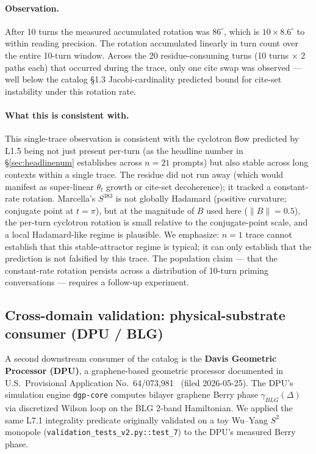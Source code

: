 \documentclass[11pt,letterpaper]{article}
\begin{document}
\paragraph{Observation.}
After 10 turns the measured accumulated rotation was $86^\circ$,
which is $10 \times 8.6^\circ$ to within reading precision. The
rotation accumulated linearly in turn count over the entire
10-turn window. Across the 20 residue-consuming turns (10 turns
$\times$ 2 paths each) that occurred during the trace, only one
cite swap was observed --- well below the catalog \S1.3
Jacobi-cardinality predicted bound for cite-set instability under
this rotation rate.

\paragraph{What this is consistent with.}
This single-trace observation is consistent with the cyclotron
flow predicted by L1.5 being not just present per-turn (as the
headline number in
\S\ref{sec:headlinenum} establishes across $n = 21$ prompts) but
also stable across long contexts within a single trace. The
residue did not run away (which would manifest as super-linear
$\theta_t$ growth or cite-set decoherence); it tracked a
constant-rate rotation. Marcella's $S^{383}$ is not globally
Hadamard (positive curvature; conjugate point at $t = \pi$), but
at the magnitude of $B$ used here ($\|B\| = 0.5$), the per-turn
cyclotron rotation is small relative to the conjugate-point scale,
and a local Hadamard-like regime is plausible. We emphasize: $n =
1$ trace cannot establish that this stable-attractor regime is
typical; it can only establish that the prediction is not
falsified by this trace. The population claim --- that the
constant-rate rotation persists across a distribution of 10-turn
priming conversations --- requires a follow-up experiment.

\subsection{Cross-domain validation: physical-substrate consumer (DPU / BLG)}
\label{sec:validation-dpu}

A second downstream consumer of the catalog is the \textbf{Davis
Geometric Processor (DPU)}, a graphene-based geometric processor
documented in U.S.\ Provisional Application
No.~64/073,981~\cite{davis2026dpu} (filed 2026-05-25). The DPU's
simulation engine \texttt{dgp-core} computes bilayer graphene Berry
phase $\gamma_{BLG}(\Delta)$ via discretized Wilson loop on the BLG
2-band Hamiltonian. We applied the same L7.1 integrality predicate
originally validated on a toy Wu--Yang $S^2$ monopole
(\texttt{validation\_tests\_v2.py::test\_7}) to the DPU's measured
Berry phase.
\end{document}
